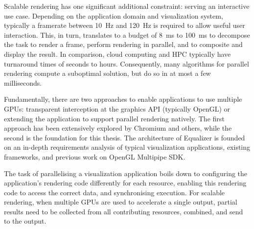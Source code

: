 Scalable rendering has one significant additional constraint: serving
an interactive use case. Depending on the application domain and visualization
system, typically a framerate between 10~Hz and 120~Hz is required to allow
useful user interaction. This, in turn, translates to a budget of 8~ms to
100~ms to decompose the task to render a frame, perform rendering in parallel,
and to composite and display the result. In comparison, cloud computing and
HPC typically have turnaround times of seconds to hours. Consequently, many
algorithms for parallel rendering compute a suboptimal solution,
but do so in at most a few milliseconds.

Fundamentally, there are two approaches to enable applications to use multiple
GPUs: transparent interception at the graphics API (typically OpenGL) or
extending the application to support parallel rendering natively. The first
approach has been extensively explored by Chromium and others, while the second
is the foundation for this thesis. The architecture of Equalizer is founded on
an in-depth requirements analysis of typical visualization applications,
existing frameworks, and previous work on OpenGL Multipipe SDK.

The task of parallelising a visualization application boils down to configuring
the application's rendering code differently for each resource, enabling this
rendering code to access the correct data, and synchronising execution. For
scalable rendering, when multiple GPUs are used to accelerate a single output,
partial results need to be collected from all contributing resources, combined,
and send to the output.


